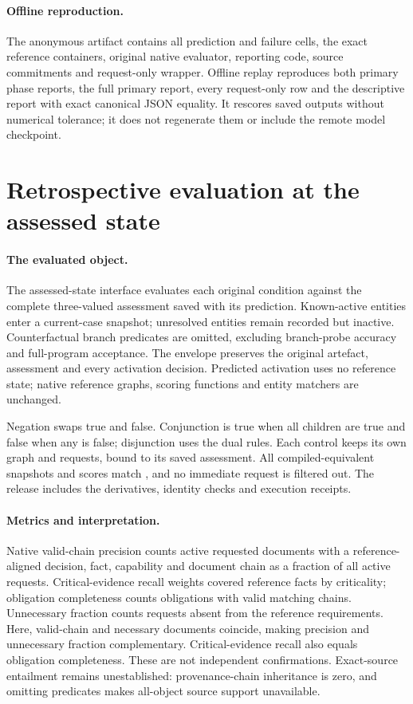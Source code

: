 \paragraph{Offline reproduction.}
The anonymous artifact contains all \nbCells{} prediction and failure
cells, the exact \nbClaims{} reference containers, original native evaluator,
reporting code, source commitments and request-only wrapper. Offline replay
reproduces both primary phase reports, the full primary report, every
request-only row and the descriptive report with exact canonical JSON
equality. It rescores saved outputs without numerical tolerance; it does
not regenerate them or include the remote model checkpoint.

\section{Retrospective evaluation at the assessed state}
\label{app:assessed-state}

\paragraph{The evaluated object.}
The assessed-state interface evaluates each original condition against the
complete three-valued assessment saved with its prediction. Known-active
entities enter a current-case snapshot; unresolved entities remain recorded
but inactive. Counterfactual branch predicates are omitted, excluding
branch-probe accuracy and full-program acceptance. The envelope preserves
the original artefact, assessment and every activation decision. Predicted
activation uses no reference state; native reference graphs, scoring
functions and entity matchers are unchanged.

Negation swaps true and false. Conjunction is true when all children are
true and false when any is false; disjunction uses the dual rules.
Each control keeps its own graph and requests, bound to its saved
\casepath assessment. All \asAllCpN{} compiled-equivalent snapshots and
scores match \casepath, and no immediate request is filtered out.
The release includes the derivatives, identity checks and execution receipts.

\paragraph{Metrics and interpretation.}
Native valid-chain precision counts active requested documents with a
reference-aligned decision, fact, capability and document chain as a fraction
of all active requests. Critical-evidence recall weights covered reference
facts by criticality; obligation completeness counts obligations with valid
matching chains. Unnecessary fraction counts requests absent from the
reference requirements. Here, valid-chain and necessary documents coincide, making
precision and unnecessary fraction complementary. Critical-evidence recall
also equals obligation completeness. These are not independent confirmations.
Exact-source entailment remains unestablished: provenance-chain inheritance
is zero, and omitting predicates makes all-object source support unavailable.

